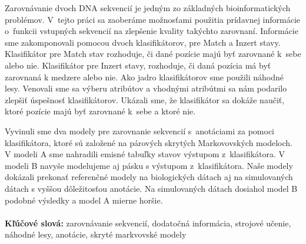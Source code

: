 Zarovnávanie dvoch DNA sekvencií je jedným zo základných
bioinformatických problémov. V~tejto práci sa zaoberáme možnosťami použitia prídavnej informácie o~funkcii vstupných sekvencií na zlepšenie kvality takýchto zarovnaní.
Informácie sme zakomponovali pomocou dvoch klasifikátorov, pre Match a Inzert stavy.
Klasifikátor pre Match stav rozhoduje, či dané pozície majú byť zarovnané k~sebe alebo nie. Klasifikátor pre Inzert stavy, rozhoduje, či daná pozícia má byť zarovnaná k medzere alebo nie. Ako jadro klasifikátorov sme použili náhodné lesy. Venovali sme sa výberu atribútov a vhodnými atribútmi sa nám podarilo zlepšiť úspešnosť klasifikátorov. Ukázali sme, že klasifikátor sa dokáže naučiť, ktoré pozície majú byť zarovnané k~sebe a ktoré nie.

Vyvinuli sme dva modely pre zarovnanie sekvencií s~anotáciami za pomoci klasifikátora, ktoré sú založené na párových skrytých Markovovských modeloch.
V modeli A sme nahradili emisné tabuľky stavov výstupom z~klasifikátora.
V modeli B navyše modelujeme aj pásku s výstupom z~klasifikátora.
Naše modely dokázali prekonať referenčné modely na biologických dátach aj na simulovaných dátach s vyššou dôležitosťou anotácie. Na simulovaných dátach dosiahol model B podobné výsledky a model A mierne horšie.
\\ \\
{\bf Kľúčové slová:} zarovnávanie sekvencií, dodatočná informácia, strojové učenie, náhodné lesy, anotácie, skryté markvovské modely
